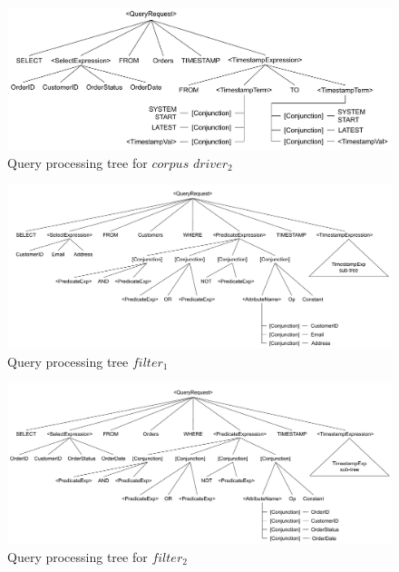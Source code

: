 \begin{figure}[t]
  \centering
    \includegraphics[width=\textwidth]{./figures/design_pattern/qpt_corpus_driver_orders.pdf}
  \caption{Query processing tree for $corpus$ $driver_2$}
  \label{fig:qpt_corpus_driver_orders}
\end{figure}

\begin{figure}[t]
  \centering
    \includegraphics[width=\textwidth]{./figures/design_pattern/qpt_filter_customers.pdf}
  \caption{Query processing tree $filter_1$}
  \label{fig:qpt_filter_customers}
\end{figure}

\begin{figure}[t]
  \centering
    \includegraphics[width=\textwidth]{./figures/design_pattern/qpt_filter_orders.pdf}
  \caption{Query processing tree for $filter_2$}
  \label{fig:qpt_filter_orders}
\end{figure}

